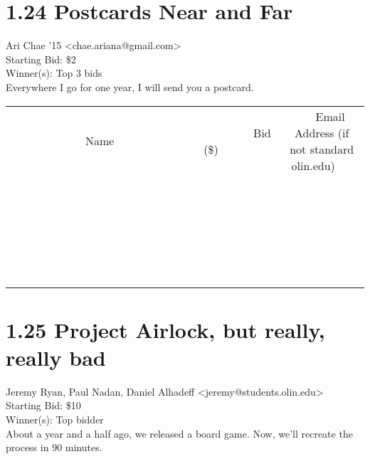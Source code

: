 \documentclass[11pt]{article}
\begin{document}
					\section*{1.24 Postcards Near and Far}
					Ari Chae '15 <chae.ariana@gmail.com> \\
					Starting Bid: \$2 \\
					Winner(s): Top 3 bids \\
					Everywhere I go for one year, I will send you a postcard. \\
					[6ex]
					\begin{tabular}{c c c}
						~~~~~~~~~~~~~Name~~~~~~~~~~~~~ & ~~~~~~~~~Bid (\$)~~~~~~~~~ & ~~~Email Address (if not standard olin.edu)~~~ \\
				
 & & \\
\hline
 & & \\
\hline
 & & \\
\hline
 & & \\
\hline
 & & \\
\hline
 & & \\
\hline
 & & \\
\hline
 & & \\
\hline
 & & \\
\hline
 & & \\
\hline
 & & \\
\hline
 & & \\
\hline
 & & \\
\hline
 & & \\
\hline
 & & \\
\hline
 & & \\
\hline
 & & \\
\hline
 & & \\
\hline
 & & \\
\hline
 & & \\
\hline
 & & \\
\hline
 & & \\
\hline
 & & \\
\hline
 & & \\
\hline
 & & \\
\hline
 & & \\
\hline
					\end{tabular}
					\clearpage
				
					\section*{1.25 Project Airlock, but really, really bad}
					Jeremy Ryan, Paul Nadan, Daniel Alhadeff <jeremy@students.olin.edu> \\
					Starting Bid: \$10 \\
					Winner(s): Top bidder \\
					About a year and a half ago, we released a board game. Now, we'll recreate the process in 90 minutes.
\end{document}
